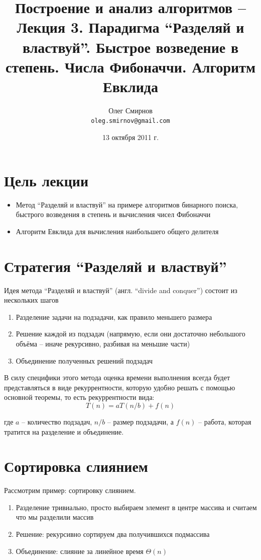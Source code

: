 \documentclass[a4paper,11pt]{article}
\author{Олег Смирнов\\
\texttt{oleg.smirnov@gmail.com}}
\date{13 октября 2011 г.}
\title{Построение и анализ алгоритмов -- Лекция 3. Парадигма ``Разделяй и 
властвуй''. Быстрое возведение в степень. Числа Фибоначчи. Алгоритм Евклида}
\begin{document}
\maketitle
\tableofcontents
\newpage

\section*{Цель лекции}
\begin{itemize}
\item Метод ``Разделяй и властвуй'' на примере алгоритмов бинарного поиска,
  быстрого возведения в степень и вычисления чисел Фибоначчи
\item Алгоритм Евклида для вычисления наибольшего общего делителя
\end{itemize}

\section{Стратегия ``Разделяй и властвуй''}
Идея метода ``Разделяй и властвуй'' (англ. ``divide and conquer'') состоит из
нескольких шагов

\begin{enumerate}
\item Разделение задачи на подзадачи, как правило меньшего размера
\item Решение каждой из подзадач (напрямую, если они достаточно небольшого 
объёма -- иначе рекурсивно, разбивая на меньшие части)
\item Объединение полученных решений подзадач
\end{enumerate}

В силу специфики этого метода оценка времени выполнения всегда будет 
представляться в виде рекуррентности, которую удобно решать с помощью 
основной теоремы, то есть рекуррентности вида:
\begin{equation*}
  T(n) = aT(n/b) + f(n)
\end{equation*}

где $a$ -- количество подзадач, $n/b$ -- размер подзадачи, а $f(n)$ -- работа,
которая тратится на разделение и объединение.

\section{Сортировка слиянием}
Рассмотрим пример: сортировку слиянием.
\begin{enumerate}
\item Разделение тривиально, просто выбираем элемент в центре массива и считаем
  что мы разделили массив
\item Решение: рекурсивно сортируем два получившихся подмассива
\item Объединение: слияние за линейное время $\Theta(n)$
\end{enumerate}
\end{document}
